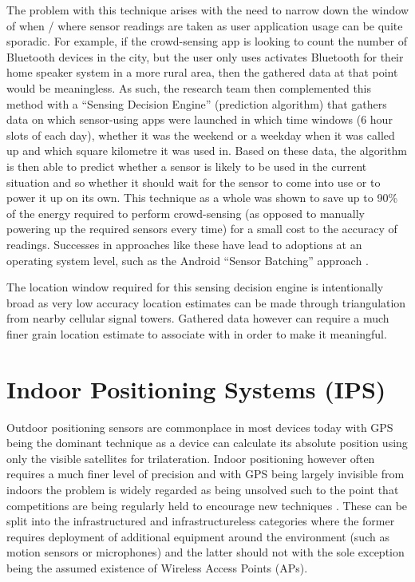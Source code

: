 \documentclass{UoYCSproject}
\begin{document}
            The problem with this technique arises with the need to narrow down the window of when / where sensor readings are taken as user application usage can be quite sporadic. For example, if the crowd-sensing app is looking to count the number of Bluetooth devices in the city, but the user only uses activates Bluetooth for their home speaker system in a more rural area, then the gathered data at that point would be meaningless. As such, the research team then complemented this method with a ``Sensing Decision Engine'' (prediction algorithm) that gathers data on which sensor-using apps were launched in which time windows (6 hour slots of each day), whether it was the weekend or a weekday when it was called up and which square kilometre it was used in. Based on these data, the algorithm is then able to predict whether a sensor is likely to be used in the current situation and so whether it should wait for the sensor to come into use or to power it up on its own. This technique as a whole was shown to save up to 90\% of the energy required to perform crowd-sensing (as opposed to manually powering up the required sensors every time) for a small cost to the accuracy of readings. Successes in approaches like these have lead to adoptions at an operating system level, such as the Android ``Sensor Batching'' approach \citep{AndroidSenseBatch}.
            
            The location window required for this sensing decision engine is intentionally broad as very low accuracy location estimates can be made through triangulation from nearby cellular signal towers. Gathered data however can require a much finer grain location estimate to associate with in order to make it meaningful.
                
        \section{Indoor Positioning Systems (IPS)}
        \label{sec:ips}
        
            Outdoor positioning sensors are commonplace in most devices today with GPS being the dominant technique as a device can calculate its absolute position using only the visible satellites for trilateration. Indoor positioning however often requires a much finer level of precision and with GPS being largely invisible from indoors the problem is widely regarded as being unsolved such to the point that competitions are being regularly held to encourage new techniques \citep{MSLOCComp}. These can be split into  the infrastructured and infrastructureless categories where the former requires deployment of additional equipment around the environment (such as motion sensors or microphones) and the latter should not with the sole exception being the assumed existence of Wireless Access Points (APs).
            
\end{document}
